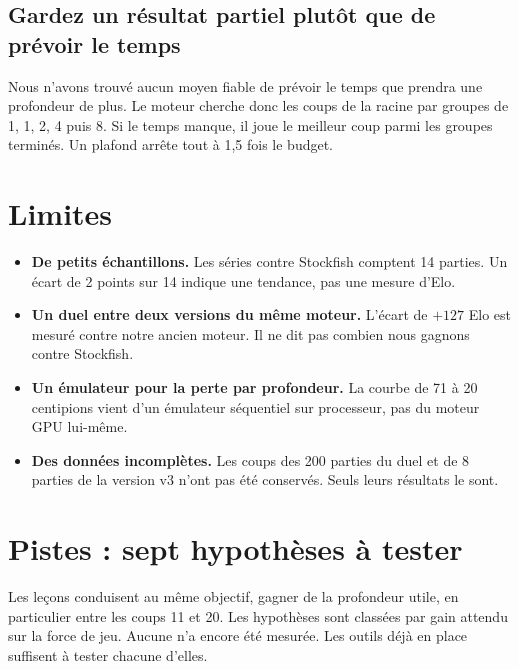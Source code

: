 \documentclass[11pt,a4paper]{article}
\theoremstyle{plain}
\begin{document}
\subsection*{Gardez un résultat partiel plutôt que de prévoir le temps}
Nous n'avons trouvé aucun moyen fiable de prévoir le temps que prendra une profondeur de plus. Le
moteur cherche donc les coups de la racine par groupes de 1, 1, 2, 4 puis 8. Si le temps manque,
il joue le meilleur coup parmi les groupes terminés. Un plafond arrête tout à 1,5 fois le budget.

\section{Limites}
\begin{itemize}
\item \textbf{De petits échantillons.} Les séries contre Stockfish comptent 14 parties. Un écart
de 2 points sur 14 indique une tendance, pas une mesure d'Elo.
\item \textbf{Un duel entre deux versions du même moteur.} L'écart de $+127$ Elo est mesuré
contre notre ancien moteur. Il ne dit pas combien nous gagnons contre Stockfish.
\item \textbf{Un émulateur pour la perte par profondeur.} La courbe de 71 à 20 centipions vient
d'un émulateur séquentiel sur processeur, pas du moteur GPU lui-même.
\item \textbf{Des données incomplètes.} Les coups des 200 parties du duel et de 8 parties de la
version v3 n'ont pas été conservés. Seuls leurs résultats le sont.
\end{itemize}

\section{Pistes : sept hypothèses à tester}

Les leçons conduisent au même objectif, gagner de la profondeur utile, en particulier entre les
coups 11 et 20. Les hypothèses sont classées par gain attendu sur la force de jeu. Aucune n'a
encore été mesurée. Les outils déjà en place suffisent à tester chacune d'elles.
\end{document}
